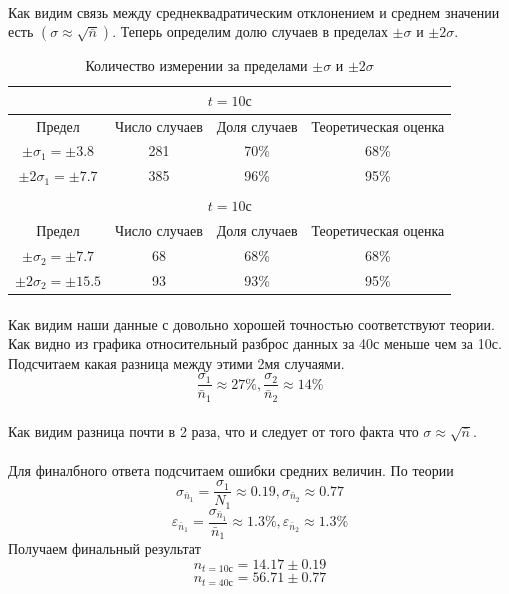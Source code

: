\documentclass[a4paper, 12pt]{article}
\begin{document}
    \paragraph{}
    Как видим связь между среднеквадратическим отклонением и среднем значении есть $(\sigma \approx \sqrt{\bar{n}})$.
    Теперь определим долю случаев в пределах $\pm\sigma$ и $\pm2\sigma$.

    \begin{table}[H]
    \begin{center}
    \begin{tabular}{|c|c|c|c|}\hline
    \multicolumn{4}{|c|}{$t=10с$}\\\hline
    Предел & Число случаев & Доля случаев & Теоретическая оценка\\\hline
    $\pm \sigma_1 = \pm 3.8$ & 281 & 70\% & 68\% \\
    $\pm 2\sigma_1 = \pm 7.7$ & 385 & 96\% & 95\% \\\hline
    \multicolumn{4}{c}{}\\\hline
    \multicolumn{4}{|c|}{$t=10с$}\\\hline
    Предел & Число случаев & Доля случаев & Теоретическая оценка\\\hline
    $\pm \sigma_2 = \pm 7.7$ & 68 & 68\% & 68\% \\
    $\pm 2\sigma_2 = \pm 15.5$ & 93 & 93\% & 95\% \\\hline

    \end{tabular}
    \caption{Количество измерении за пределами $\pm\sigma$ и $\pm2\sigma$}
    \end{center}
    \end{table}

    \paragraph{}
    Как видим наши данные с довольно хорошей точностью соответствуют теории. Как видно из графика относительный разброс данных за 40с меньше чем за 10с. Подсчитаем какая разница между этими 2мя случаями.
    \[\frac{\sigma_1}{\bar{n}_1} \approx 27\%, \frac{\sigma_2}{\bar{n}_2} \approx 14\%\]
    \paragraph{}
    Как видим разница почти в 2 раза, что и следует от того факта что $\sigma \approx \sqrt{\bar{n}}$.
    \paragraph{}
    Для финалбного ответа подсчитаем ошибки средних величин. По теории
    \[\sigma_{\bar{n}_1} = \frac{\sigma_{1}}{N_1} \approx 0.19, \sigma_{\bar{n}_2} \approx 0.77\]
    \[\varepsilon_{\bar{n}_1} = \frac{\sigma_{\bar{n}_1}}{\bar{n}_1}\approx 1.3\%, \varepsilon_{\bar{n}_2}\approx 1.3\%\]
    Получаем финальный результат
    \[n_{t=10с}=14.17 \pm 0.19\]
    \[n_{t=40с}=56.71 \pm 0.77\]
\end{document}
